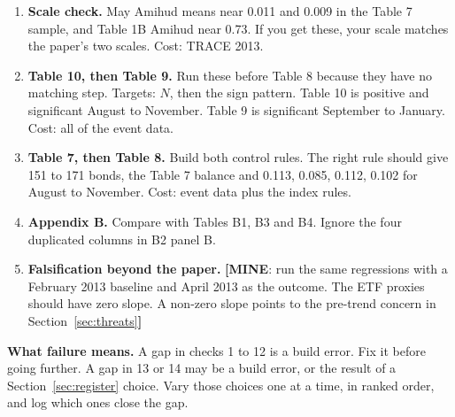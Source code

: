 \documentclass[10pt,a4paper]{article}
\newcommand{\MY}[1]{\textcolor{cmy}{\textbf{[MINE}: #1\textbf{]}}}
\begin{document}
\begin{enumerate}
\item \textbf{Scale check.} May Amihud means near 0.011 and 0.009 in the Table 7 sample, and Table 1B Amihud near 0.73. If you get these, your scale matches the paper's two scales. Cost: TRACE 2013.
\item \textbf{Table 10, then Table 9.} Run these before Table 8 because they have no matching step. Targets: $N$, then the sign pattern. Table 10 is positive and significant August to November. Table 9 is significant September to January. Cost: all of the event data.
\item \textbf{Table 7, then Table 8.} Build both control rules. The right rule should give 151 to 171 bonds, the Table 7 balance and 0.113, 0.085, 0.112, 0.102 for August to November. Cost: event data plus the index rules.
\item \textbf{Appendix B.} Compare with Tables B1, B3 and B4. Ignore the four duplicated columns in B2 panel B.
\item \textbf{Falsification beyond the paper.} \MY{run the same regressions with a February 2013 baseline and April 2013 as the outcome. The ETF proxies should have zero slope. A non-zero slope points to the pre-trend concern in Section~\ref{sec:threats}}
\end{enumerate}

\textbf{What failure means.} A gap in checks 1 to 12 is a build error. Fix it before going further. A gap in 13 or 14 may be a build error, or the result of a Section~\ref{sec:register} choice. Vary those choices one at a time, in ranked order, and log which ones close the gap.
\end{document}
